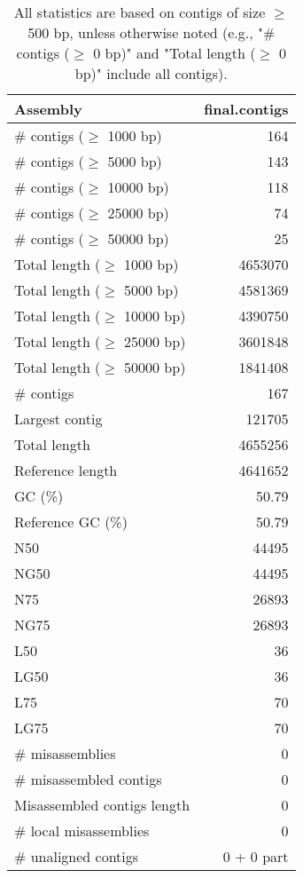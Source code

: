 \documentclass[12pt,a4paper]{article}
\begin{document}
\begin{table}[ht]
\begin{center}
\caption{All statistics are based on contigs of size $\geq$ 500 bp, unless otherwise noted (e.g., "\# contigs ($\geq$ 0 bp)" and "Total length ($\geq$ 0 bp)" include all contigs).}
\begin{tabular}{|l*{1}{|r}|}
\hline
Assembly & final.contigs \\ \hline
\# contigs ($\geq$ 1000 bp) & 164 \\ \hline
\# contigs ($\geq$ 5000 bp) & 143 \\ \hline
\# contigs ($\geq$ 10000 bp) & 118 \\ \hline
\# contigs ($\geq$ 25000 bp) & 74 \\ \hline
\# contigs ($\geq$ 50000 bp) & 25 \\ \hline
Total length ($\geq$ 1000 bp) & 4653070 \\ \hline
Total length ($\geq$ 5000 bp) & 4581369 \\ \hline
Total length ($\geq$ 10000 bp) & 4390750 \\ \hline
Total length ($\geq$ 25000 bp) & 3601848 \\ \hline
Total length ($\geq$ 50000 bp) & 1841408 \\ \hline
\# contigs & 167 \\ \hline
Largest contig & 121705 \\ \hline
Total length & 4655256 \\ \hline
Reference length & 4641652 \\ \hline
GC (\%) & 50.79 \\ \hline
Reference GC (\%) & 50.79 \\ \hline
N50 & 44495 \\ \hline
NG50 & 44495 \\ \hline
N75 & 26893 \\ \hline
NG75 & 26893 \\ \hline
L50 & 36 \\ \hline
LG50 & 36 \\ \hline
L75 & 70 \\ \hline
LG75 & 70 \\ \hline
\# misassemblies & 0 \\ \hline
\# misassembled contigs & 0 \\ \hline
Misassembled contigs length & 0 \\ \hline
\# local misassemblies & 0 \\ \hline
\# unaligned contigs & 0 + 0 part \\ \hline

\end{tabular}
\end{center}
\end{table}
\end{document}
